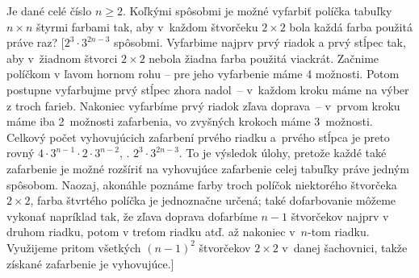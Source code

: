 {Je dané celé číslo $n\geq2$. Koľkými spôsobmi je možné vyfarbiť políčka
tabuľky $n \times n$ štyrmi farbami tak,
aby v~každom štvorčeku $2\times 2$ bola každá farba použitá
práve raz? [$2^3 \cdot 3^{2n-3}$ spôsobmi.
Vyfarbime najprv prvý riadok a prvý stĺpec tak, aby v~žiadnom
štvorci $2\times 2$ nebola žiadna farba použitá viackrát.
Začnime políčkom v ľavom hornom rohu -- pre jeho vyfarbenie máme 4 možnosti. Potom postupne vyfarbujme prvý stĺpec zhora nadol~-- v~každom kroku máme na výber z troch farieb. Nakoniec vyfarbíme
prvý riadok zľava doprava~-- v~prvom kroku máme iba 2~možnosti zafarbenia,
vo zvyšných krokoch máme 3~možnosti. Celkový počet vyhovujúcich
zafarbení prvého riadku a~prvého stĺpca je preto rovný
$4 \cdot3^{n-1}\cdot2\cdot 3^{n-2}$, \tj. $2^3 \cdot 3^{2n-3}$. To
je výsledok úlohy, pretože každé také zafarbenie je možné rozšíriť
na vyhovujúce zafarbenie celej tabuľky práve jedným spôsobom.
Naozaj, akonáhle poznáme farby troch políčok niektorého štvorčeka $2\times 2$,
farba štvrtého políčka je jednoznačne určená; také dofarbovanie môžeme vykonať
napríklad tak, že zľava doprava dofarbíme $n-1$ štvorčekov
najprv v druhom riadku, potom v treťom riadku atď. až nakoniec v~$n$-tom
riadku. Využijeme pritom všetkých $(n-1)^2$ štvorčekov $2\times2$ v~danej
šachovnici, takže získané zafarbenie je vyhovujúce.]

}

